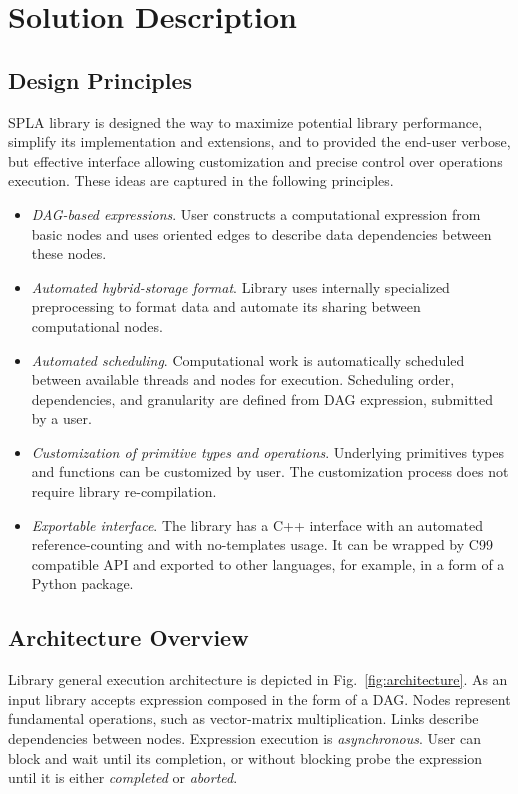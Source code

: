\section{Solution Description}

\subsection{Design Principles}

SPLA library is designed the way to maximize potential library performance, simplify its implementation and extensions, and to provided the end-user verbose, but effective interface allowing customization and precise control over operations execution. These ideas are captured in the following principles.

\begin{itemize}
    \item \textit{DAG-based expressions}. User constructs a computational expression from basic nodes and uses oriented edges to describe data dependencies between these nodes. 
    \item \textit{Automated hybrid-storage format}. Library uses internally specialized preprocessing to format data and automate its sharing between computational nodes.
    \item \textit{Automated scheduling}. Computational work is automatically scheduled between available threads and nodes for execution. Scheduling order, dependencies, and granularity are defined from DAG expression, submitted by a user.
    \item \textit{Customization of primitive types and operations}. Underlying primitives types and functions can be customized by user. The customization process does not require library re-compilation. 
    \item \textit{Exportable interface}. The library has a C++ interface with an automated reference-counting and with no-templates usage. It can be wrapped by C99 compatible API and exported to other languages, for example, in a form of a Python package.
\end{itemize}

\subsection{Architecture Overview}

Library general execution architecture is depicted in Fig.~\ref{fig:architecture}. As an input library accepts expression composed in the form of a DAG.
Nodes represent fundamental operations, such as vector-matrix multiplication. 
Links describe dependencies between nodes.
Expression execution is \textit{asynchronous}. 
User can block and wait until its completion, or without blocking probe the expression until it is either \textit{completed} or \textit{aborted}. 

